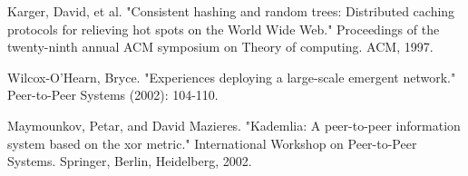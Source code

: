 \documentclass[journal]{IEEEtran}
\begin{document}
\begin{thebibliography}{1}
 Karger, David, et al. "Consistent hashing and random trees: Distributed caching protocols for relieving hot spots on the World Wide Web." Proceedings of the twenty-ninth annual ACM symposium on Theory of computing. ACM, 1997.

 Wilcox-O’Hearn, Bryce. "Experiences deploying a large-scale emergent network." Peer-to-Peer Systems (2002): 104-110.

 Maymounkov, Petar, and David Mazieres. "Kademlia: A peer-to-peer information system based on the xor metric." International Workshop on Peer-to-Peer Systems. Springer, Berlin, Heidelberg, 2002.

\end{thebibliography}

% 







\end{document}
